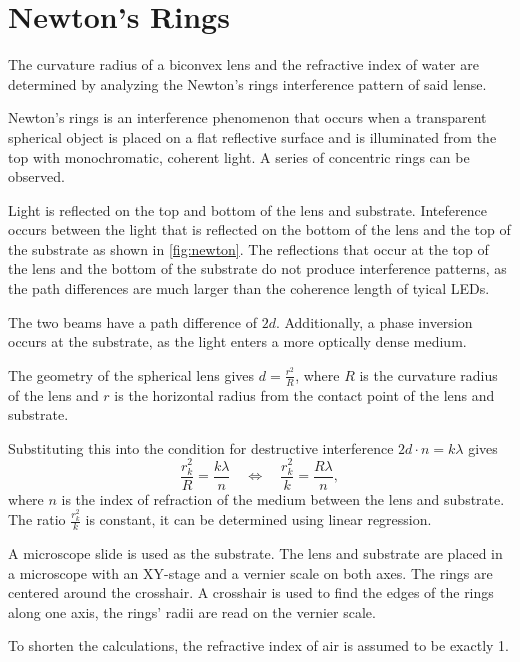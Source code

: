 \chapter{Newton's Rings}

The curvature radius of a biconvex lens and the refractive index of water are determined by analyzing the Newton's rings interference pattern of said lense.


Newton's rings is an interference phenomenon that occurs when a transparent spherical object is placed on a flat reflective surface and is illuminated from the top with monochromatic, coherent light.
A series of concentric rings can be observed.

Light is reflected on the top and bottom of the lens and substrate.
Inteference occurs between the light that is reflected on the bottom of the lens and the top of the substrate as shown in \autoref{fig:newton}.
The reflections that occur at the top of the lens and the bottom of the substrate do not produce interference patterns, as the path differences are much larger than the coherence length of tyical LEDs.

The two beams have a path difference of $2 d$.
Additionally, a phase inversion occurs at the substrate, as the light enters a more optically dense medium.

The geometry of the spherical lens gives $d = \frac{r^2}{R}$, where $R$ is the curvature radius of the lens and $r$ is the horizontal radius from the contact point of the lens and substrate.

Substituting this into the condition for destructive interference $2 d \cdot n = k \lambda$ gives
\begin{equation}\label{eq:newton}
	\frac{r_k^2}{R} = \frac{k \lambda}{n} \quad \Leftrightarrow \quad \frac{r_k^2}{k} = \frac{R \lambda}{n},
\end{equation}
where $n$ is the index of refraction of the medium between the lens and substrate.
The ratio $\frac{r_k^2}{k}$ is constant, it can be determined using linear regression.

A microscope slide is used as the substrate.
The lens and substrate are placed in a microscope with an XY-stage and a vernier scale on both axes.
The rings are centered around the crosshair.
A crosshair is used to find the edges of the rings along one axis, the rings' radii are read on the vernier scale.

To shorten the calculations, the refractive index of air is assumed to be exactly \num{1}.

